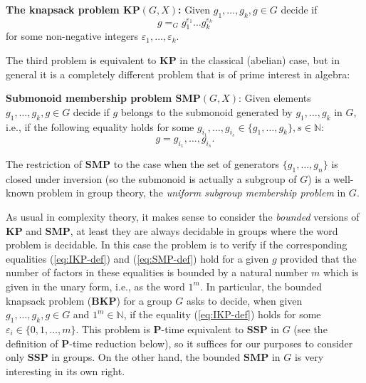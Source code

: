 \documentclass[10pt]{amsart}
\theoremstyle{definition}
\def\P{{\mathbf{P}}}
\def\SSP{{\mathbf{SSP}}}
\def\SMP{{\mathbf{SMP}}}
\def\BKP{{\mathbf{BKP}}}
\def\KP{{\mathbf{KP}}}
\def\IKP{{\mathbf{IKP}}}
\begin{document}
\medskip
\noindent
{\bf The knapsack problem $\KP(G,X)$\index{$\KP(G,X)$}:}  Given $g_1,\ldots,g_k,g\in G$
decide if
\begin{equation}\label{eq:IKP-def}
g =_G g_1^{\varepsilon_1} \ldots g_k^{\varepsilon_k}
\end{equation}
for some  non-negative integers $\varepsilon_1,\ldots,\varepsilon_k$.


\medskip


The third problem is equivalent to $\KP$ in the classical (abelian) case, but in general it is a completely different problem that is of prime  interest in algebra:

\medskip
\noindent
{\bf Submonoid membership problem $\mathbf{SMP}(G,X)$\index{$\SMP(G,X)$}}:  Given elements $g_1,\ldots,g_k,g\in G$
decide if $g$ belongs to the submonoid generated by $g_1, \ldots, g_k$ in $G$, i.e., if the following equality holds for some $g_{i_1}, \ldots, g_{i_s} \in \{g_1, \ldots, g_k\}, s \in \mathbb{N}$:
\begin{equation}\label{eq:SMP-def}
g = g_{i_1}, \ldots, g_{i_s}.
\end{equation}

\medskip
The restriction of $\SMP$ to the case when the set of generators $\{g_1, \ldots,g_n\}$ is closed under inversion (so the submonoid is actually a subgroup of $G$) is  a well-known problem in group theory, the {\em uniform subgroup membership problem} in $G$.

As usual in complexity theory, it makes sense to consider the {\em bounded} versions of $\KP$ and $\SMP$, at least they are always decidable in groups where the word problem is decidable. In this case the problem is to verify  if the corresponding equalities (\ref{eq:IKP-def}) and  (\ref{eq:SMP-def}) hold for a given $g$ provided that the number of factors in these equalities  is bounded by a natural number $m$ which is given in the unary form, i.e., as the word $1^m$. In particular, the bounded knapsack problem ($\BKP$) for a group $G$ asks to decide, when  given $g_1,\ldots,g_k,g\in G$ and $1^m\in\mathbb N$, if the equality (\ref{eq:IKP-def}) holds for some
$\varepsilon_i \in \{0,1, \ldots, m \}$.
This problem  is  $\P$-time equivalent to  $\SSP$ in $G$ (see the definition of $\P$-time reduction below), so it suffices for our purposes to consider only $\SSP$ in groups.
On the other hand,  the bounded $\SMP$ in $G$ is very interesting in its own right.
\end{document}
